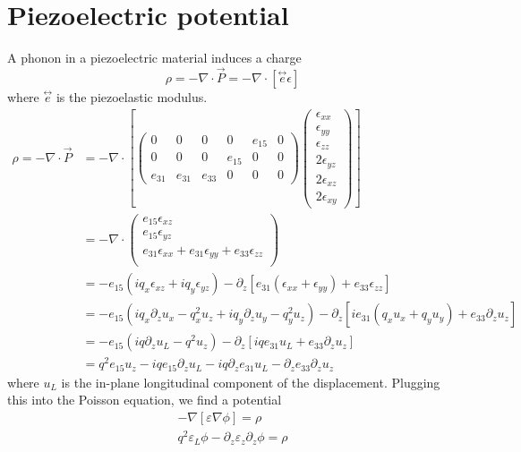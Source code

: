 \documentclass{article}
\begin{document}
\section{Piezoelectric potential} 
A phonon in a piezoelectric material induces a charge
\begin{equation}
  \rho=-\nabla \cdot \vec P= -\nabla \cdot \left[ \overset\leftrightarrow{e} \epsilon \right]
\end{equation}
where $\overset\leftrightarrow{e}$ is the piezoelastic modulus.
\begin{align}
  \rho=-\nabla \cdot \vec P&= -\nabla \cdot \left[
  \begin{pmatrix}
    0 & 0 & 0 & 0 & e_{15} & 0\\
    0 & 0 & 0 &  e_{15} & 0 & 0\\
    e_{31} & e_{31} & e_{33} & 0 & 0 & 0
  \end{pmatrix}
  \begin{pmatrix}
    \epsilon_{xx}\\
    \epsilon_{yy}\\
    \epsilon_{zz}\\
    2\epsilon_{yz}\\
    2\epsilon_{xz}\\
    2\epsilon_{xy}
  \end{pmatrix} \right]\\
  &=-\nabla \cdot 
    \begin{pmatrix}
      e_{15}\epsilon_{xz}\\
      e_{15}\epsilon_{yz}\\
      e_{31}\epsilon_{xx}+e_{31}\epsilon_{yy}+e_{33}\epsilon_{zz}\\
    \end{pmatrix}\\
    &=-e_{15}(iq_x\epsilon_{xz}+iq_y\epsilon_{yz})
    - \partial_z [e_{31}(\epsilon_{xx}+\epsilon_{yy})+e_{33}\epsilon_{zz}]\\
    &=-e_{15}(iq_x\partial_zu_x-q_x^2u_z+iq_y\partial_zu_y-q_y^2u_z)
    - \partial_z [ie_{31}(q_xu_x+q_yu_y)+e_{33}\partial_zu_z]\\
    &=-e_{15}(iq\partial_zu_L-q^2u_z)
    - \partial_z [iqe_{31}u_L+e_{33}\partial_zu_z]\\
    &=q^2e_{15}u_z-iqe_{15}\partial_zu_L
    - iq\partial_z e_{31}u_L- \partial_ze_{33}\partial_zu_z
\end{align}
where $u_L$ is the in-plane longitudinal component of the displacement. Plugging this into the Poisson equation, we find a potential
\begin{align}
  -\nabla \left[\varepsilon \nabla \phi \right]= \rho \\
  q^2\varepsilon_L\phi -\partial_z\varepsilon_z \partial_z \phi = \rho 
\end{align}
\end{document}
